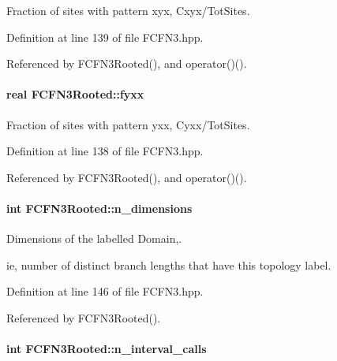 \-Fraction of sites with pattern xyx, \-Cxyx/\-Tot\-Sites. 



\-Definition at line 139 of file \-F\-C\-F\-N3.\-hpp.



\-Referenced by \-F\-C\-F\-N3\-Rooted(), and operator()().

\hypertarget{classFCFN3Rooted_af92c9b535582cab0402f4ab5c16d96a7}{
\paragraph[{fyxx}]{\setlength{\rightskip}{0pt plus 5cm}real {\bf \-F\-C\-F\-N3\-Rooted\-::fyxx}}}\label{classFCFN3Rooted_af92c9b535582cab0402f4ab5c16d96a7}


\-Fraction of sites with pattern yxx, \-Cyxx/\-Tot\-Sites. 



\-Definition at line 138 of file \-F\-C\-F\-N3.\-hpp.



\-Referenced by \-F\-C\-F\-N3\-Rooted(), and operator()().

\hypertarget{classFCFN3Rooted_af84f68c176afe037f53b5e771fdaca10}{
\paragraph[{n\-\_\-dimensions}]{\setlength{\rightskip}{0pt plus 5cm}int {\bf \-F\-C\-F\-N3\-Rooted\-::n\-\_\-dimensions}}}\label{classFCFN3Rooted_af84f68c176afe037f53b5e771fdaca10}


\-Dimensions of the labelled \-Domain,. 

ie, number of distinct branch lengths that have this topology label. 

\-Definition at line 146 of file \-F\-C\-F\-N3.\-hpp.



\-Referenced by \-F\-C\-F\-N3\-Rooted().

\hypertarget{classFCFN3Rooted_a8aab095c503c3cc6f1c3b5a8571dac7b}{
\paragraph[{n\-\_\-interval\-\_\-calls}]{\setlength{\rightskip}{0pt plus 5cm}int {\bf \-F\-C\-F\-N3\-Rooted\-::n\-\_\-interval\-\_\-calls}}}\label{classFCFN3Rooted_a8aab095c503c3cc6f1c3b5a8571dac7b}


